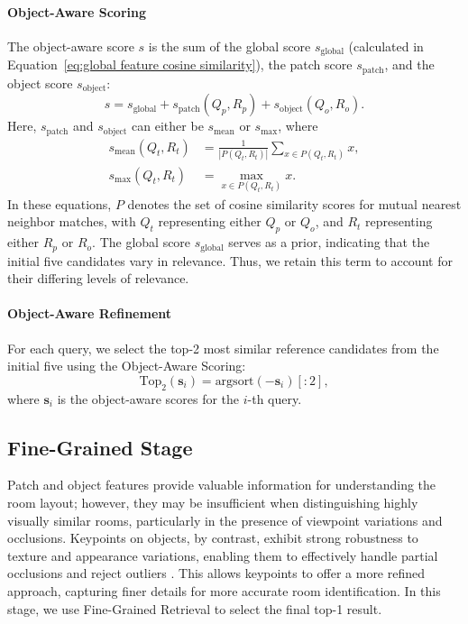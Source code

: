 \paragraph{Object-Aware Scoring} The object-aware score \(s\) is the sum of the global score \(s_{\text{global}}\) (calculated in Equation~\ref{eq:global feature cosine similarity}), the patch score \(s_{\text{patch}}\), and the object score \(s_{\text{object}}\):
\begin{equation}
    s = s_{\text{global}} + s_{\text{patch}}(Q_p, R_p) + s_{\text{object}}(Q_o, R_o).
    \label{eq:object-aware scoring}
\end{equation}
Here, \(s_{\text{patch}}\) and \(s_{\text{object}}\) can either be \(s_{\text{mean}}\) or \(s_{\max}\), where
\begin{subequations}
\begin{align}
    s_{\text{mean}}(Q_t, R_t) &= \frac{1}{|P(Q_t, R_t)|} \sum_{x \in P(Q_t, R_t)} x,
    \label{eq:mean}\\
    s_{\max}(Q_t, R_t) &= \max_{x \in P(Q_t, R_t)} x.
    \label{eq:max}
\end{align}
\end{subequations}
In these equations, \(P\) denotes the set of cosine similarity scores for mutual nearest neighbor matches, with \(Q_t\) representing either \(Q_p\) or \(Q_o\), and \(R_t\) representing either \(R_p\) or \(R_o\). The global score \(s_{\text{global}}\) serves as a prior, indicating that the initial five candidates vary in relevance. Thus, we retain this term to account for their differing levels of relevance.

\vspace{-8pt}
\paragraph{Object-Aware Refinement} For each query, we select the top-2 most similar reference candidates from the initial five using the Object-Aware Scoring:
\begin{equation}
    \text{Top}_2(\mathbf{s}_{i}) = \text{argsort}(-\mathbf{s}_{i})[:2],
\end{equation}
where \(\mathbf{s}_{i}\) is the object-aware scores for the \(i\)-th query.

\subsection{Fine-Grained Stage}

Patch and object features provide valuable information for understanding the room layout; however, they may be insufficient when distinguishing highly visually similar rooms, particularly in the presence of viewpoint variations and occlusions. Keypoints on objects, by contrast, exhibit strong robustness to texture and appearance variations, enabling them to effectively handle partial occlusions and reject outliers \cite{1498756}. This allows keypoints to offer a more refined approach, capturing finer details for more accurate room identification. In this stage, we use Fine-Grained Retrieval to select the final top-1 result.

